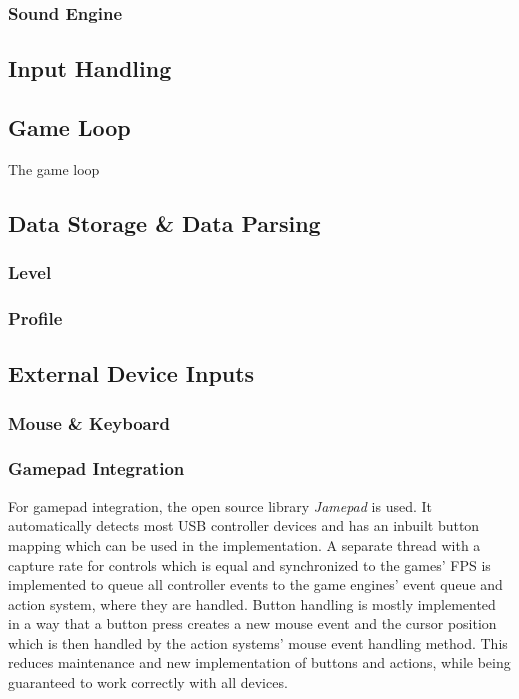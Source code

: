 \subsubsection{Sound Engine}\label{subsubsec:sound-engine}

\subsection{Input Handling}\label{subsec:input-handling}

\subsection{Game Loop}
The game loop
\subsection{Data Storage \& Data Parsing}
\subsubsection{Level}
\subsubsection{Profile}
\subsection{External Device Inputs}\label{subsec:external-device-inputs}
\subsubsection{Mouse \& Keyboard}\label{subsubsec:mouse-&-keyboard}
\subsubsection{Gamepad Integration}\label{subsubsec:gamepad-integration}
For gamepad integration, the open source library \textit{Jamepad} is used.
It automatically detects most USB controller devices and has an inbuilt button mapping which can be used in the implementation.
A separate thread with a capture rate for controls which is equal and synchronized to the games' FPS is implemented to queue all controller
events to the game engines' event queue and action system, where they are handled.
Button handling is mostly implemented in a way that a button press creates a new mouse event and the cursor position which is then handled by the action
systems' mouse event handling method.
This reduces maintenance and new implementation of buttons and actions, while being guaranteed to work correctly with all devices.

